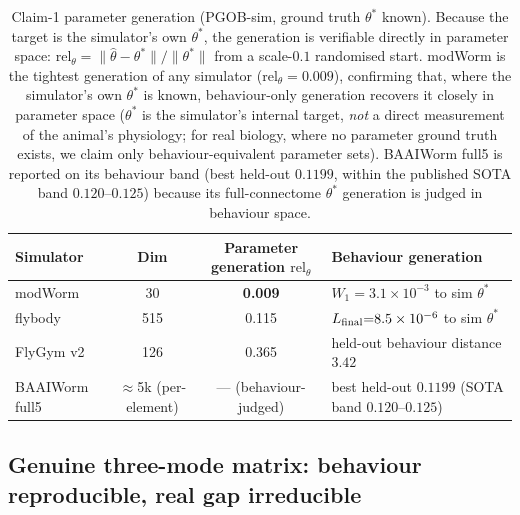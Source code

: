 \documentclass[11pt]{article}
\begin{document}
\begin{table}[H]
\centering\small
\caption{Claim-1 parameter generation (PGOB-sim, ground truth $\theta^{*}$ known). Because the target is the simulator's own $\theta^{*}$, the generation is verifiable directly in parameter space: $\mathrm{rel}_\theta{=}\lVert\hat\theta-\theta^{*}\rVert/\lVert\theta^{*}\rVert$ from a scale-$0.1$ randomised start. modWorm is the tightest generation of any simulator ($\mathrm{rel}_\theta{=}0.009$), confirming that, where the simulator's own $\theta^{*}$ is known, behaviour-only generation recovers it closely in parameter space ($\theta^{*}$ is the simulator's internal target, \emph{not} a direct measurement of the animal's physiology; for real biology, where no parameter ground truth exists, we claim only behaviour-equivalent parameter sets). BAAIWorm full5 is reported on its behaviour band (best held-out $0.1199$, within the published SOTA band $0.120$--$0.125$) because its full-connectome $\theta^{*}$ generation is judged in behaviour space.}
\label{tab:claim1_recovery}
\begin{tabular}{lccl}\toprule
Simulator & Dim & Parameter generation $\mathrm{rel}_\theta$ & Behaviour generation \\\midrule
modWorm   & 30  & \textbf{0.009} & $W_1{=}3.1\times10^{-3}$ to sim $\theta^{*}$ \\
flybody   & 515 & 0.115 & $L_{\rm final}{=}8.5\times10^{-6}$ to sim $\theta^{*}$ \\
FlyGym v2 & 126 & 0.365 & held-out behaviour distance $3.42$ \\
BAAIWorm full5 & $\approx$5k (per-element) & --- (behaviour-judged) & best held-out $0.1199$ (SOTA band $0.120$--$0.125$) \\\bottomrule
\end{tabular}
\end{table}

\subsection{Genuine three-mode matrix: behaviour reproducible, real gap irreducible}
\label{sec:genuine_matrix}
\end{document}
